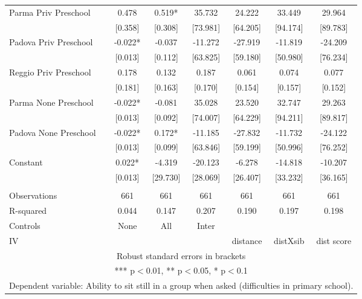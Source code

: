 \begin{tabular}{lcccccc}
Parma Priv Preschool & 0.478 & 0.519* & 35.732 & 24.222 & 33.449 & 29.964 \\
 & [0.358] & [0.308] & [73.981] & [64.205] & [94.174] & [89.783] \\
Padova Priv Preschool & -0.022* & -0.037 & -11.272 & -27.919 & -11.819 & -24.209 \\
 & [0.013] & [0.112] & [63.825] & [59.180] & [50.980] & [76.234] \\
Reggio Priv Preschool & 0.178 & 0.132 & 0.187 & 0.061 & 0.074 & 0.077 \\
 & [0.181] & [0.163] & [0.170] & [0.154] & [0.157] & [0.152] \\
Parma None Preschool & -0.022* & -0.081 & 35.028 & 23.520 & 32.747 & 29.263 \\
 & [0.013] & [0.092] & [74.007] & [64.229] & [94.211] & [89.817] \\
Padova None Preschool & -0.022* & 0.172* & -11.185 & -27.832 & -11.732 & -24.122 \\
 & [0.013] & [0.099] & [63.846] & [59.199] & [50.996] & [76.252] \\
Constant & 0.022* & -4.319 & -20.123 & -6.278 & -14.818 & -10.207 \\
 & [0.013] & [29.730] & [28.069] & [26.407] & [33.232] & [36.165] \\
 &  &  &  &  &  &  \\
Observations & 661 & 661 & 661 & 661 & 661 & 661 \\
R-squared & 0.044 & 0.147 & 0.207 & 0.190 & 0.197 & 0.198 \\
Controls & None & All & Inter &  &  &  \\
 IV &  &  &  & distance & distXsib & dist score \\ \hline
\multicolumn{7}{c}{ Robust standard errors in brackets} \\
\multicolumn{7}{c}{ *** p$<$0.01, ** p$<$0.05, * p$<$0.1} \\
\multicolumn{7}{c}{ Dependent variable: Ability to sit still in a group when asked (difficulties in primary school).} \\
\end{tabular}
